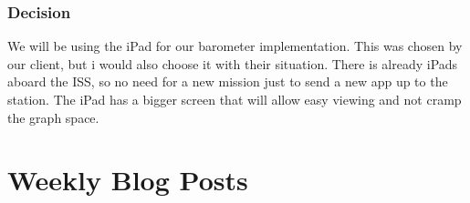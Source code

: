 \documentclass[onecolumn, draftclsnofoot,10pt, compsoc]{IEEEtran}
\begin{document}
\subsubsection{Decision}
We will be using the iPad for our barometer implementation.
 This was chosen by our client, but i would also choose it with their situation.
 There is already iPads aboard the ISS, so no need for a new mission just to send a new app up to the station.
The iPad has a bigger screen that will allow easy viewing and not cramp the graph space.

\section{Weekly Blog Posts}
\end{document}
